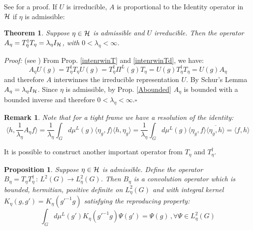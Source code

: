 \documentclass[11pt]{article}
\newtheorem{remark}[definition]{Remark}
\newtheorem{theorem}[definition]{Theorem}
\newtheorem{proposition}{Proposition}[section]
\newcommand{\conj}[1]{\overline{#1}}
\begin{document}
See \cite{AAG14} for a proof. If $U$ is irreducible, $A$ is proportional to the Identity operator in $\cal H$ if $\eta$ is admissible:

\begin{theorem}\label{Aidentity}
 Suppose $\eta\in {\cal H}$ is admissible and $U$ irreducible. Then the operator $A_\eta=T_\eta^\dagger T_\eta=\lambda_\eta I_{\cal H}$, with $0<\lambda_\eta<\infty$.
\end{theorem}

\noindent \textit{Proof:} (see \cite{Grossmann85}) From Prop. \ref{intenrwinT} and \ref{intenrwinTd}, we have:
%
\begin{equation}
 A_\eta U(g) = T_\eta^\dagger T_\eta U(g) = T_\eta^\dagger \Pi^L(g) T_\eta = U(g) T_\eta^\dagger T_\eta = U(g) A_\eta
\end{equation}
%
and therefore $A$ interwinnes the irreducible representation $U$. By Schur's Lemma $A_\eta=\lambda_\eta I_{\cal H}$. Since $\eta$ is admissible, by Prop.  \ref{Abounded} $A_\eta$ is bounded with a bounded inverse and therefore $0<\lambda_\eta<\infty$.$\square$


\begin{remark}\label{Remark-ResolutionIdentity}
 Note that for a tight frame we have a resolution of the identity:
 \begin{equation}
  \langle h, \frac{1}{\lambda_\eta}A_\eta f\rangle=\frac{1}{\lambda_\eta}\int_{G}d\mu^L(g) \langle \eta_g,f\rangle\langle h,\eta_g \rangle = \frac{1}{\lambda_\eta}\int_{G}d\mu^L(g)    \langle \eta_g,f\rangle\conj{\langle \eta_g, h \rangle}=\langle f,h\rangle
 \end{equation}
 
 
 
 
\end{remark}


It is possible to construct another important operator from $T_\eta$ and $T_\eta^\dagger$.

\begin{proposition}\label{OverlappingKernel}
 Suppose $\eta\in {\cal H}$ is admissible. Define the  operator $B_\eta=T_\eta T_\eta^\dagger\,:\,L^2(G)\rightarrow L_\eta^2(G)$. Then $B_\eta$ is a convolution operator which is bounded, hermitian,  positive definite on  $L_\eta^2(G)$ and with integral kernel $K_\eta(g,g')=K_\eta(g'^{-1}g)$ satisfying the reproducing property:
 \begin{equation}
  \int_G d\mu^L(g') K_\eta(g'^{-1}g)\Psi(g') = \Psi(g) \,,\forall \Psi\in   L_\eta^2(G)
 \end{equation}

 
\end{proposition}
\end{document}
